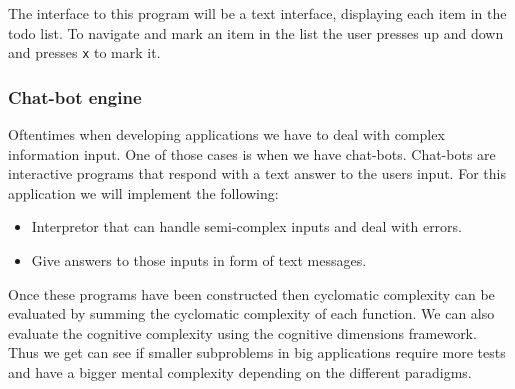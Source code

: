 The interface to this program will be a text interface, displaying each item in
the todo list. To navigate and mark an item in the list the user presses up and
down and presses \texttt{x} to mark it.

\subsubsection*{Chat-bot engine}

Oftentimes when developing applications we have to deal with complex information
input. One of those cases is when we have chat-bots. Chat-bots are interactive
programs that respond with a text answer to the users input. For this
application we will implement the following:

\begin{itemize}
    \item Interpretor that can handle semi-complex inputs and deal with errors.
    \item Give answers to those inputs in form of text messages.
\end{itemize}

\noindent Once these programs have been constructed then cyclomatic complexity
can be evaluated by summing the cyclomatic complexity of each function. We can
also evaluate the cognitive complexity using the cognitive dimensions framework.
Thus we get can see if smaller subproblems in big applications require more
tests and have a bigger mental complexity depending on the different paradigms.
